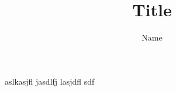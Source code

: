 \documentclass[10pt,a4paper]{article}
\author{Name}
\title{Title}
\begin{document}
\maketitle

aslkasjfl jasdlfj lasjdfl sdf
\end{document}
